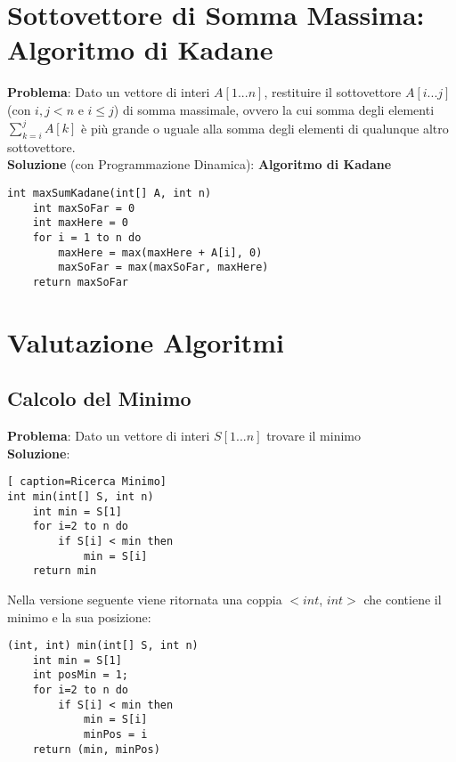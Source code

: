 \documentclass[../cheatSheetAlgoritmi.tex]{subfiles}
\begin{document}
\section{Sottovettore di Somma Massima: Algoritmo di Kadane}
\textbf{Problema}: Dato un vettore di interi $A[1...n]$, restituire il sottovettore $A[i...j]$ (con $i, j < n$ e $i \leq j$) di somma massimale, ovvero la cui somma degli elementi $\sum_{k=i}^j A[k]$ è più grande o uguale alla somma degli elementi di qualunque altro sottovettore.\\
\textbf{Soluzione} (con Programmazione Dinamica): \textbf{Algoritmo di Kadane}
\begin{lstlisting}[caption=Kadane Algorithm]
int maxSumKadane(int[] A, int n)
	int maxSoFar = 0
	int maxHere = 0
	for i = 1 to n do
		maxHere = max(maxHere + A[i], 0)
		maxSoFar = max(maxSoFar, maxHere)
	return maxSoFar
\end{lstlisting}

\section{Valutazione Algoritmi} \subsection{Calcolo del Minimo}
\textbf{Problema}: Dato un vettore di interi $S[1...n]$ trovare il minimo\\
\textbf{Soluzione}:
\begin{lstlisting}[ caption=Ricerca Minimo]
int min(int[] S, int n)
	int min = S[1]
	for i=2 to n do
		if S[i] < min then
			min = S[i]
	return min
\end{lstlisting}
Nella versione seguente viene ritornata una coppia $<$$int$, $int$$>$ che contiene il minimo e la sua posizione:
\begin{lstlisting}[caption=Ricerca Minimo ritornando gli indici]
(int, int) min(int[] S, int n)
	int min = S[1]
	int posMin = 1;
	for i=2 to n do
		if S[i] < min then
			min = S[i]
			minPos = i
	return (min, minPos)
\end{lstlisting}
\newpage
\end{document}
